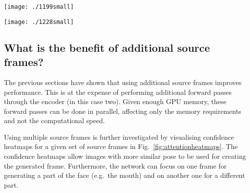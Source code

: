 \documentclass{bmvc2k}
\newcommand{\figref}[1]{Fig.~\ref{#1}}
\def\networkname{FAb-Net}
\begin{document}
\begin{figure*}[t]
    \centering

\begin{minipage}[t][0.56\width]{0.4\textwidth}\texttt{[image: ./1199small]} \\
\centering

\end{minipage}
\hspace{1cm}
\begin{minipage}[t][0.56\width]{0.4\textwidth}\centering

\texttt{[image: ./1228small]} \\

\end{minipage}

    \vspace{-0.2cm}
    \caption{Confidence heatmaps learned by \networkname. Higher intensity corresponds to higher confidence. The network chooses the frames with most similar poses to draw from and ignores those with less similar poses  (see Example (a)). In Example (b), the mouth has higher confidence in the third source frame allowing the network to re-construct the teeth that are present in the target frame. More examples can be found in the supp. material.
    \vspace{-0.3cm}
    }
    \label{fig:attentionheatmaps}
\end{figure*}

\subsection{What is the benefit of additional source frames?}
\label{exp:additionalsourceframes}
The previous sections have shown that using additional source frames improves performance. 
This is at the expense of performing additional forward passes through the encoder (in this case two). 
Given enough GPU memory, these forward passes can be done in parallel, affecting only the memory requirements and not
the computational speed.

Using multiple source frames is further investigated by visualising confidence heatmaps for a given set of source frames  in \figref{fig:attentionheatmaps}.
The confidence heatmaps allow images with more similar pose to be used for creating the generated frame. Furthermore, the network can focus on one frame for generating a part of the face (e.g.~the mouth) and on another one for a different part. 
\end{document}
